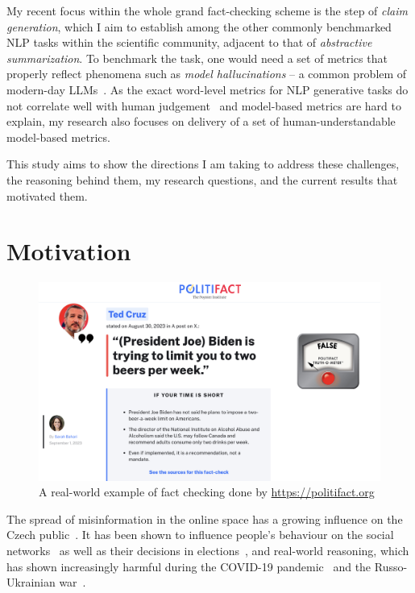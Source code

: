My recent focus within the whole grand fact-checking scheme is the step of \textit{claim generation}, which I aim to establish among the other commonly benchmarked NLP tasks within the scientific community, adjacent to that of \textit{abstractive summarization}.
To benchmark the task, one would need a set of metrics that properly reflect phenomena such as \textit{model hallucinations} -- a common problem of modern-day LLMs~\cite{Ji_2023}.
As the exact word-level metrics for NLP generative tasks do not correlate well with human judgement~\cite{bert-score} and model-based metrics are hard to explain, my research also focuses on delivery of a set of human-understandable model-based metrics.

This study aims to show the directions I am taking to address these challenges, the reasoning behind them, my research questions, and the current results that motivated them.

\section{Motivation}
\label{sec:motivation}

\begin{figure}
    \includegraphics[width=14cm]{fig/politifact.pdf}
    \caption{A real-world example of fact checking done by \url{https://politifact.org}}
    \label{fig:politifact}
\end{figure}

The spread of misinformation in the online space has a growing influence on the Czech public~\cite{stem}. It has been shown to influence people's behaviour on the social networks~\cite{Lazer1094} as well as their decisions in elections~\cite{10.1257/jep.31.2.211}, and real-world reasoning, which has shown increasingly harmful during the COVID-19 pandemic~\cite{BARUA2020100119} and the Russo-Ukrainian war~\cite{georgiana_stanescu_2022_6795674}.

